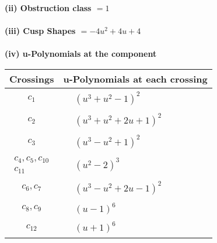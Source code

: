 \documentclass[1p]{elsarticle_modified}
\theoremstyle{definition}
\begin{document}
\flushleft \textbf{(ii) Obstruction class $= 1$}\\~\\
\flushleft \textbf{(iii) Cusp Shapes $= -4 u^2+4 u+4$}\\~\\
\newpage\renewcommand{\arraystretch}{1}
\flushleft \textbf{(iv) u-Polynomials at the component}\newline \\
\begin{tabular}{m{50pt}|m{274pt}}
Crossings & \hspace{64pt}u-Polynomials at each crossing \\
\hline $$\begin{aligned}c_{1}\end{aligned}$$&$\begin{aligned}
&(u^3+u^2-1)^2
\end{aligned}$\\
\hline $$\begin{aligned}c_{2}\end{aligned}$$&$\begin{aligned}
&(u^3+u^2+2 u+1)^2
\end{aligned}$\\
\hline $$\begin{aligned}c_{3}\end{aligned}$$&$\begin{aligned}
&(u^3- u^2+1)^2
\end{aligned}$\\
\hline $$\begin{aligned}c_{4},c_{5},c_{10}\\c_{11}\end{aligned}$$&$\begin{aligned}
&(u^2-2)^3
\end{aligned}$\\
\hline $$\begin{aligned}c_{6},c_{7}\end{aligned}$$&$\begin{aligned}
&(u^3- u^2+2 u-1)^2
\end{aligned}$\\
\hline $$\begin{aligned}c_{8},c_{9}\end{aligned}$$&$\begin{aligned}
&(u-1)^6
\end{aligned}$\\
\hline $$\begin{aligned}c_{12}\end{aligned}$$&$\begin{aligned}
&(u+1)^6
\end{aligned}$\\
\hline
\end{tabular}\\~\\
\end{document}
